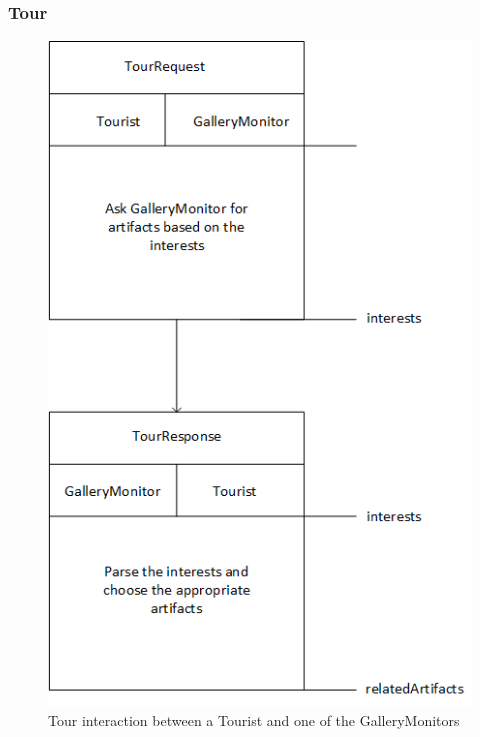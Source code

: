 \documentclass[a4paper, 11pt]{article}
\begin{document}
\subsubsection{Tour}

\begin{figure}[H]
	\caption{Tour interaction between a Tourist and one of the GalleryMonitors}
	\centering
	\includegraphics[scale=0.8]{./images/interaction-tourguide.png}
\end{figure}
\end{document}
